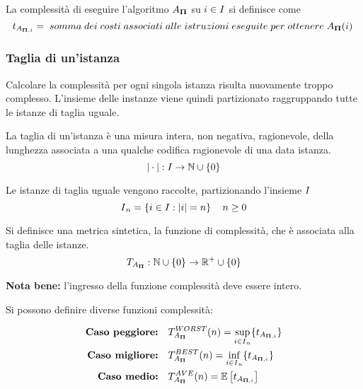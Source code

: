 La complessità di eseguire l'algoritmo $A_{\bm{\Pi}{}}$ su $i \in I{}$ si definisce come
$$t_{A_{\bm{\Pi}{},i}}=\;somma\;dei\;costi\;associati\;alle\;istruzioni\;eseguite\;per\;ottenere\;A_{\bm{\Pi}{}}(i)\;$$

\subsubsection{Taglia di un'istanza}
Calcolare la complessità per ogni singola istanza risulta nuovamente troppo complesso. L'insieme delle instanze viene quindi partizionato raggruppando tutte le istanze di taglia uguale.

\begin{definition}\label{def:taglia}
    La taglia di un'istanza è una misura intera, non negativa, ragionevole, della lunghezza associata a una qualche codifica ragionevole di una data istanza.\\
    $$|\cdot|:I{}\to \mathbb{N} \cup \{0\}$$
\end{definition}

Le istanze di taglia uguale vengono raccolte, partizionando l'insieme $I{}$
$$ I{}_{n} = \left\{ i \in I{} : |i|=n \right\} \quad n \geq 0$$ 

Si definisce una metrica sintetica, la funzione di complessità, che è associata alla taglia delle istanze.
$$ T_{A_{\bm{\Pi}{}}} : \mathbb{N} \cup \{0\} \to \mathbb{R}^{+} \cup \{0\}$$

\textbf{Nota bene:} l'ingresso della funzione complessità deve essere intero.

Si possono definire diverse funzioni complessità:

\begin{align*}
\textrm{\textbf{Caso peggiore:}} &\quad T_{A_{\bm{\Pi}{}}}^{WORST} (n) = \sup_{i \in I{}_{n}} \{t_{A_{\bm{\Pi}{},i}} \} \\
\textrm{\textbf{Caso migliore:}} &\quad T_{A_{\bm{\Pi}{}}}^{BEST} (n) = \inf_{i \in I{}_{n}} \{t_{A_{\bm{\Pi}{},i}} \} \\
\textrm{\textbf{Caso medio:}} &\quad T_{A_{\bm{\Pi}{}}}^{AVE} (n) = \mathbb{E} \left[t_{A_{\bm{\Pi}{},i}} \right]
\end{align*}

